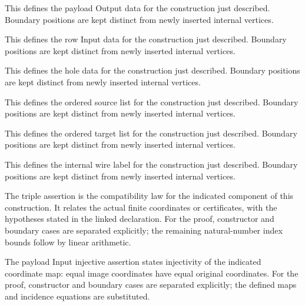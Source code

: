 This defines the payload Output data for the construction just described. Boundary positions are kept distinct from newly inserted internal vertices.
\par{}

This defines the row Input data for the construction just described. Boundary positions are kept distinct from newly inserted internal vertices.
\par{}

This defines the hole data for the construction just described. Boundary positions are kept distinct from newly inserted internal vertices.
\par{}

This defines the ordered source list for the construction just described. Boundary positions are kept distinct from newly inserted internal vertices.
\par{}

This defines the ordered target list for the construction just described. Boundary positions are kept distinct from newly inserted internal vertices.
\par{}

This defines the internal wire label for the construction just described. Boundary positions are kept distinct from newly inserted internal vertices.
\par{}

The triple assertion is the compatibility law for the indicated component of this construction. It relates the actual finite coordinates or certificates, with the hypotheses stated in the linked declaration.
For the proof, constructor and boundary cases are separated explicitly; the remaining natural-number index bounds follow by linear arithmetic.
\par{}

The payload Input injective assertion states injectivity of the indicated coordinate map: equal image coordinates have equal original coordinates.
For the proof, constructor and boundary cases are separated explicitly; the defined maps and incidence equations are substituted.
\par{}

